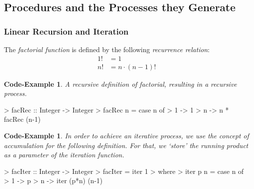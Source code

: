 \documentclass{scrartcl}
\newtheorem{impl}[defn]{Code-Example}
\numberwithin{equation}{section}
\begin{document}
\subsection{Procedures and the Processes they Generate}
\subsubsection{Linear Recursion and Iteration}

The \emph{factorial function} is defined by the following \emph{recurrence relation}:
\begin{align*}
    1! &= 1 \\ n! &= n \cdot (n-1)!
\end{align*}

\begin{impl}
A recursive definition of factorial, resulting in a recursive process.
\end{impl}

\begin{haskellcode}

> facRec :: Integer -> Integer
> facRec n = case n of
>   1 -> 1
>   n -> n * facRec (n-1)

\end{haskellcode}

\begin{impl}
In order to achieve an iterative process, we use the concept of accumulation for the following definition. For that, we `store' the running product as a parameter of the iteration function.
\end{impl}

\begin{haskellcode}

> facIter :: Integer -> Integer
> facIter = iter 1
>   where
>     iter p n = case n of
>       1 -> p
>       n -> iter (p*n) (n-1)

\end{haskellcode}
\end{document}
